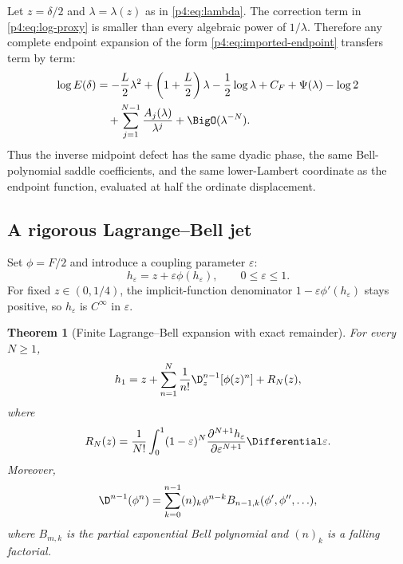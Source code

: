 \documentclass[11pt]{article}
\numberwithin{equation}{section}
\newtheorem{theorem}{Theorem}[section]
\theoremstyle{definition}
\theoremstyle{remark}
\begin{document}
\begin{corpusdeductionbox}[title=Lambert--W transfer theorem]
Let $z=\delta/2$ and $\lambda=\lambda(z)$ as in \eqref{p4:eq:lambda}.  The correction term in \eqref{p4:eq:log-proxy} is smaller than every algebraic power of $1/\lambda$.  Therefore any complete endpoint expansion of the form \eqref{p4:eq:imported-endpoint} transfers term by term:
\begin{align}
 \log E(\delta)
 &=-\frac L2\lambda^2
  +\left(1+\frac L2\right)\lambda
  -\frac12\log\lambda
  +C_F+\Psi(\lambda)-\log2
 \notag\\
 &\quad+\sum_{j=1}^{N-1}\frac{A_j(\lambda)}{\lambda^j}
  +\BigO(\lambda^{-N}).
 \label{p4:eq:inverse-lambert-transfer}
\end{align}
Thus the inverse midpoint defect has the same dyadic phase, the same Bell-polynomial saddle coefficients, and the same lower-Lambert coordinate as the endpoint function, evaluated at half the ordinate displacement.
\end{corpusdeductionbox}

\subsection{A rigorous Lagrange--Bell jet}
Set $\phi=F/2$ and introduce a coupling parameter $\varepsilon$:
\begin{equation}
 h_\varepsilon=z+\varepsilon\phi(h_\varepsilon),
 \qquad 0\le\varepsilon\le1.
 \label{p4:eq:coupled-fixed-point}
\end{equation}
For fixed $z\in(0,1/4)$, the implicit-function denominator
$1-\varepsilon\phi'(h_\varepsilon)$ stays positive, so $h_\varepsilon$ is $C^\infty$ in $\varepsilon$.

\begin{theorem}[Finite Lagrange--Bell expansion with exact remainder]
\label{p4:thm:lagrange-bell}
For every $N\ge1$,
\begin{equation}
 h_1=z+\sum_{n=1}^{N}\frac1{n!}
 \D_z^{n-1}\!\left[\phi(z)^n\right]+R_N(z),
 \label{p4:eq:lagrange-finite}
\end{equation}
where
\begin{equation}
 R_N(z)=\frac1{N!}\int_0^1(1-\varepsilon)^N
 \frac{\partial^{N+1}h_\varepsilon}{\partial\varepsilon^{N+1}}\Differential\varepsilon.
 \label{p4:eq:lagrange-remainder}
\end{equation}
Moreover,
\begin{equation}
 \D^{n-1}(\phi^n)
 =\sum_{k=0}^{n-1}(n)_k\phi^{n-k}
 B_{n-1,k}(\phi',\phi'',\ldots),
 \label{p4:eq:partial-bell}
\end{equation}
where $B_{m,k}$ is the partial exponential Bell polynomial and $(n)_k$ is a falling factorial.
\end{theorem}
\end{document}
